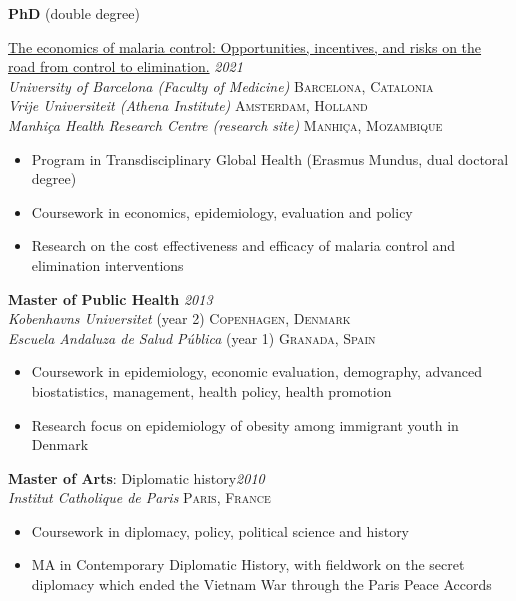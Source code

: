\documentclass[11pt]{article}
\begin{document}
\noindent \textbf{PhD} (double degree) \\ {\href{https://research.vu.nl/en/publications/the-economics-of-malaria-control-opportunities-incentives-and-ris}{The economics of malaria control: Opportunities, incentives, and risks on the road from control to elimination.} \hfill \emph{2021}\\
\noindent \emph{University of Barcelona (Faculty of Medicine)} \hfill \textsc{Barcelona, Catalonia} \\
\noindent \emph{Vrije Universiteit (Athena Institute)} \hfill \textsc{Amsterdam, Holland} \\
\noindent \emph{Manhiça Health Research Centre (research site)} \hfill \textsc{Manhiça, Mozambique}

\vspace{-2mm}
\begin{itemize}\itemsep0pt \parskip0pt 
\item Program in Transdisciplinary Global Health (Erasmus Mundus, dual doctoral degree)
\item Coursework in economics, epidemiology, evaluation and policy
\item Research on the cost effectiveness and efficacy of malaria control and elimination interventions
\end{itemize}
\noindent \textbf{Master of Public Health} \hfill \emph{2013} \\
\noindent \emph{Kobenhavns Universitet} (year 2) \hfill \textsc{Copenhagen, Denmark} \\
\noindent \emph{Escuela Andaluza de Salud Pública} (year 1) \hfill \textsc{Granada, Spain}

\vspace{-2mm}
\begin{itemize}\itemsep0pt \parskip0pt 
\item Coursework in epidemiology, economic evaluation, demography, advanced biostatistics, management, health policy, health promotion
\item Research focus on epidemiology of obesity among immigrant youth in Denmark 
\end{itemize}


\noindent \textbf{Master of Arts}: Diplomatic history\hfill \emph{2010}\\
\noindent \emph{Institut Catholique de Paris} \hfill \textsc{Paris, France}
\vspace{-2mm}
\begin{itemize}\itemsep0pt \parskip0pt 
\item Coursework in diplomacy, policy, political science and history
\item MA in Contemporary Diplomatic History, with fieldwork on the secret diplomacy which ended the Vietnam War through the Paris Peace Accords
\end{itemize}

}
\end{document}
